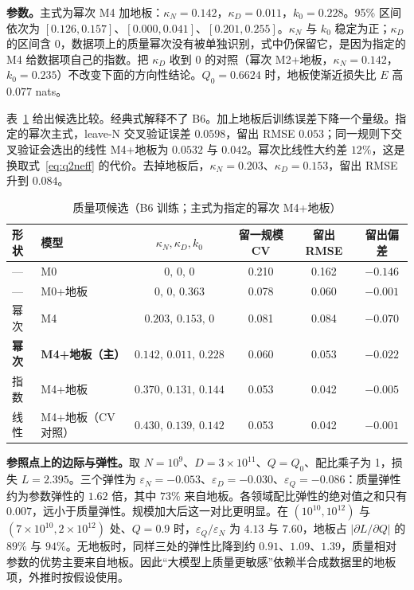 \textbf{参数。}主式为幂次 M4 加地板：$\kappa_N=0.142$，$\kappa_D=0.011$，$k_0=0.228$。95\% 区间依次为 $[0.126,0.157]$、$[0.000,0.041]$、$[0.201,0.255]$。$\kappa_N$ 与 $k_0$ 稳定为正；$\kappa_D$ 的区间含 0，数据项上的质量幂次没有被单独识别，式中仍保留它，是因为指定的 M4 给数据项自己的指数。把 $\kappa_D$ 收到 0 的对照（幂次 M2+地板，$\kappa_N=0.142$，$k_0=0.235$）不改变下面的方向性结论。$Q_0=0.6624$ 时，地板使渐近损失比 $E$ 高 $0.077$ nats。

表~\ref{tab:q2form} 给出候选比较。经典式解释不了 B6。加上地板后训练误差下降一个量级。指定的幂次主式，leave-N 交叉验证误差 $0.0598$，留出 RMSE $0.053$；同一规则下交叉验证会选出的线性 M4+地板为 $0.0532$ 与 $0.042$。幂次比线性大约差 $12\%$，这是换取式~\eqref{eq:q2neff} 的代价。去掉地板后，$\kappa_N=0.203$、$\kappa_D=0.153$，留出 RMSE 升到 $0.084$。

\begin{table}[htbp]
\centering\small
\caption{质量项候选（B6 训练；主式为指定的幂次 M4+地板）}
\label{tab:q2form}
\begin{tabular}{llcccc}
\toprule
形状 & 模型 & $\kappa_N,\kappa_D,k_0$ & 留一规模 CV & 留出 RMSE & 留出偏差 \\
\midrule
— & M0 & $0,\,0,\,0$ & 0.210 & 0.162 & $-0.146$ \\
— & M0+地板 & $0,\,0,\,0.363$ & 0.078 & 0.060 & $-0.001$ \\
幂次 & M4 & $0.203,\,0.153,\,0$ & 0.081 & 0.084 & $-0.070$ \\
\textbf{幂次} & \textbf{M4+地板（主）} & $\mathbf{0.142,\,0.011,\,0.228}$ & $\mathbf{0.060}$ & $\mathbf{0.053}$ & $\mathbf{-0.022}$ \\
指数 & M4+地板 & $0.370,\,0.131,\,0.144$ & 0.053 & 0.042 & $-0.005$ \\
线性 & M4+地板（CV 对照） & $0.430,\,0.139,\,0.142$ & 0.053 & 0.042 & $-0.001$ \\
\bottomrule
\end{tabular}
\end{table}

\textbf{参照点上的边际与弹性。}取 $N=10^9$、$D=3\times 10^{11}$、$Q=Q_0$、配比乘子为 1，损失 $L=2.395$。三个弹性为 $\varepsilon_N=-0.053$、$\varepsilon_D=-0.030$、$\varepsilon_Q=-0.086$：质量弹性约为参数弹性的 $1.62$ 倍，其中 $73\%$ 来自地板。各领域配比弹性的绝对值之和只有 $0.007$，远小于质量弹性。规模加大后这一对比更明显。在 $(10^{10},10^{12})$ 与 $(7\times 10^{10},2\times 10^{12})$ 处、$Q=0.9$ 时，$\varepsilon_Q/\varepsilon_N$ 为 $4.13$ 与 $7.60$，地板占 $|\partial L/\partial Q|$ 的 $89\%$ 与 $94\%$。无地板时，同样三处的弹性比降到约 $0.91$、$1.09$、$1.39$，质量相对参数的优势主要来自地板。因此“大模型上质量更敏感”依赖半合成数据里的地板项，外推时按假设使用。

